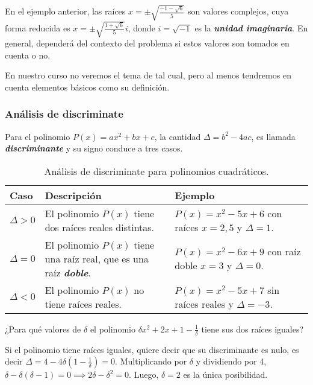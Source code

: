 En el ejemplo anterior, las raíces $x = \pm \sqrt {\frac{-1 - \sqrt{6}}{5}}$ son valores complejos, cuya forma reducida es $x = \pm \sqrt {\frac{1 + \sqrt{6}}{5}} i$, donde $i = \sqrt {-1}$ es la \textbf{\emph{unidad imaginaria}}.
En general, dependerá del contexto del problema si estos valores son tomados en cuenta o no.

En nuestro curso no veremos el tema de  tal cual, pero al menos tendremos en cuenta elementos básicos como su definición.



\subsubsection{Análisis de discriminate}

Para el polinomio $P(x) = ax^2 + bx + c$, la cantidad $\Delta = b^2 - 4ac$, es llamada \textbf{\emph{discriminante}} y su signo conduce a tres casos.
\begin{table}[H]
    \centering
    \begin{tabular}{| p{1.4cm} | p{6.5cm} | p{6.5cm} |}
        \hline
        Caso & Descripción & Ejemplo \\ \hline
        $\Delta > 0$ & El polinomio $P(x)$ tiene dos raíces reales distintas.&
            $P(x) = x^2 - 5x + 6$ con raíces $x = 2, 5$ y $\Delta = 1$. \\\hline
        $\Delta = 0$ & El polinomio $P(x)$ tiene una raíz real, que es una raíz \textbf{\emph{doble}}.&
            $P(x) = x^2 - 6x + 9$ con raíz doble $x = 3$ y $\Delta = 0$. \\\hline
        $\Delta < 0$ & El polinomio $P(x)$ no tiene raíces reales.&
            $P(x) = x^2 - 5x + 7$ sin raíces reales y $\Delta = -3$. \\\hline
    \end{tabular}
    \caption{Análisis de discriminate para polinomios cuadráticos.}
\end{table}

\begin{example}
    ¿Para qué valores de $\delta$ el polinomio $\delta x^2 + 2x + 1 - \frac{1}{\delta}$ tiene sus dos raíces iguales?
\end{example}
\begin{solution}
    Si el polinomio tiene raíces iguales, quiere decir que su discriminante es nulo, es decir $\Delta = 4 - 4\delta \left(1 - \frac{1}{\delta}\right) = 0$.
    Multiplicando por $\delta$ y dividiendo por 4, $ \delta - \delta (\delta - 1) = 0 \implies 2\delta - \delta^2 = 0$.
    Luego, $\delta = 2$ es la única posibilidad.
\end{solution}


